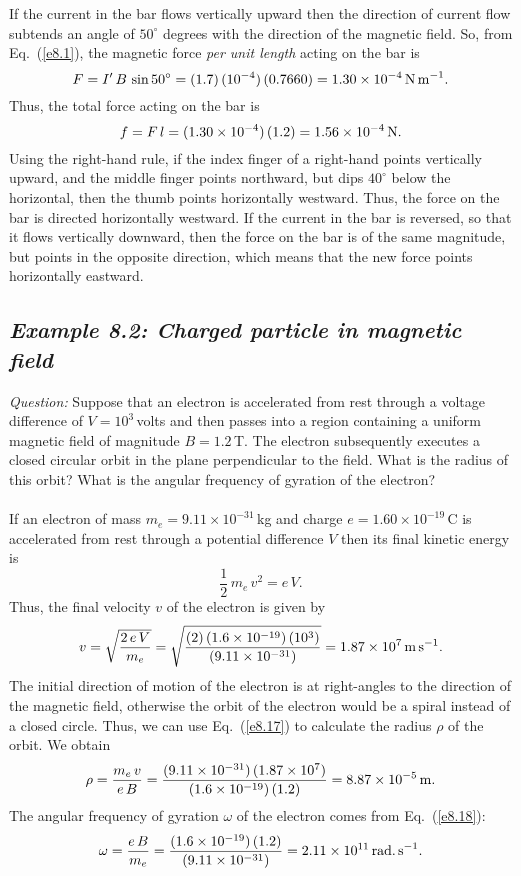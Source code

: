 If the current in the bar flows vertically upward then the direction of
current flow subtends an angle of $50^\circ$ degrees with the direction
of the magnetic field. So, from Eq.~(\ref{e8.1}), the magnetic  force {\em per unit length}\/
acting on the bar is
$$
F = I'\,B\,\sin 50^\circ= (1.7)\, (10^{-4})\,(0.7660)
= 1.30\times 10^{-4}\,{\rm N\,m}^{-1}.
$$
Thus, the total force acting on the bar
is
$$
f = F\,l = (1.30\times 10^{-4})\,(1.2) = 1.56\times 10^{-4}\,{\rm N}.
$$
Using the right-hand rule, if the index finger of a right-hand   points vertically
upward,  and the middle finger points northward, but dips $40^\circ$ below
the horizontal, then the thumb points horizontally westward. Thus, the force on the bar is directed horizontally westward. If the current in the bar is reversed, so that
it flows vertically downward, then the force on the bar is of the same magnitude, but points in the opposite direction, which means that the new force
points horizontally eastward.


\subsection*{\em Example 8.2: Charged particle in magnetic field}
{\em Question:} Suppose that an electron is accelerated from
rest through a voltage
difference of $V=10^3$\,volts and then passes into a region containing a uniform
magnetic field of magnitude $B=1.2$\,T. The electron subsequently executes a
closed  circular
orbit in the plane perpendicular to the field. What is the radius of this
orbit? What is the angular frequency of gyration of the electron?\\
~\\
 If an electron of mass $m_e
=9.11\times 10^{-31}$\,kg and charge $e=1.60\times 10^{-19}$\,C is accelerated
from rest through a potential difference $V$ then its final
kinetic energy is 
$$
\frac{1}{2}\,m_e\,v^2 = e\,V.
$$
Thus, the final velocity $v$ of the electron is given by
$$
v = \sqrt{\frac{2\,e\,V}{m_e}} = \sqrt{\frac{(2)\,(1.6\times 10^{-19})\,
(10^3)}{(9.11\times 10^{-31})}} = 1.87\times 10^{7}\,{\rm m\,s}^{-1}.
$$
The initial direction of motion of the electron is at right-angles
to the direction of the magnetic field, otherwise the orbit of the electron 
would be a spiral instead of a closed circle. Thus, we can use Eq.~(\ref{e8.17})
to calculate the radius $\rho$ of the orbit. We obtain
$$
\rho = \frac{m_e\,v}{e\,B} = \frac{ (9.11\times 10^{-31})\,( 1.87\times 10^{7})}
{(1.6\times 10^{-19})\,(1.2)} = 8.87\times 10^{-5}\,{\rm m}.
$$
The angular frequency of gyration $\omega$ of the electron comes from Eq.~(\ref{e8.18}):
$$
\omega = \frac{e\,B}{m_e} = \frac{ (1.6\times 10^{-19})\,(1.2)}{(9.11\times 10^{-31})}
= 2.11\times 10^{11}\,{\rm rad.\,s}^{-1}.
$$


